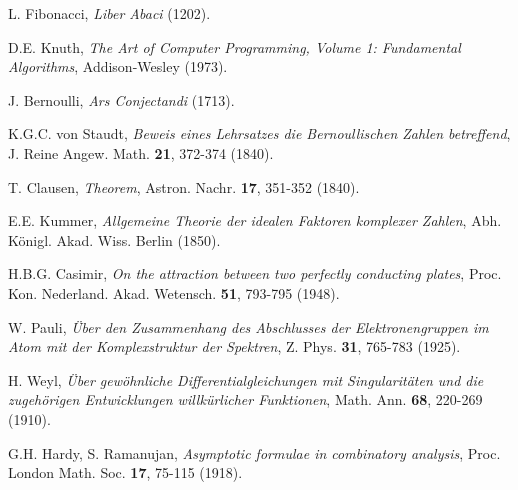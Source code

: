 \documentclass[12pt]{article}
\begin{document}
\begin{thebibliography}{99}
 L. Fibonacci, \emph{Liber Abaci} (1202).

 D.E. Knuth, \emph{The Art of Computer Programming, Volume 1: Fundamental Algorithms}, Addison-Wesley (1973).

 J. Bernoulli, \emph{Ars Conjectandi} (1713).

 K.G.C. von Staudt, \emph{Beweis eines Lehrsatzes die Bernoullischen Zahlen betreffend}, J. Reine Angew. Math. \textbf{21}, 372-374 (1840).

 T. Clausen, \emph{Theorem}, Astron. Nachr. \textbf{17}, 351-352 (1840).

 E.E. Kummer, \emph{Allgemeine Theorie der idealen Faktoren komplexer Zahlen}, Abh. Königl. Akad. Wiss. Berlin (1850).

 H.B.G. Casimir, \emph{On the attraction between two perfectly conducting plates}, Proc. Kon. Nederland. Akad. Wetensch. \textbf{51}, 793-795 (1948).

 W. Pauli, \emph{Über den Zusammenhang des Abschlusses der Elektronengruppen im Atom mit der Komplexstruktur der Spektren}, Z. Phys. \textbf{31}, 765-783 (1925).

 H. Weyl, \emph{Über gewöhnliche Differentialgleichungen mit Singularitäten und die zugehörigen Entwicklungen willkürlicher Funktionen}, Math. Ann. \textbf{68}, 220-269 (1910).

 G.H. Hardy, S. Ramanujan, \emph{Asymptotic formulae in combinatory analysis}, Proc. London Math. Soc. \textbf{17}, 75-115 (1918).

\end{thebibliography}
\end{document}
